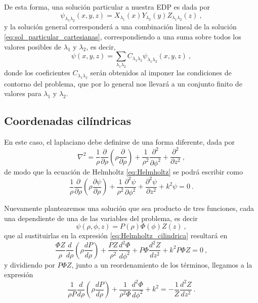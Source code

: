 De esta forma, una solución particular a nuestra EDP es dada por
\begin{equation} \label{eq:sol_particular_cartesianas}
    \psi_{\lambda_1 \lambda_2}(x,y,z) = X_{\lambda_1}(x) Y_{\lambda_2}(y) Z_{\lambda_1 \lambda_2}(z) \ ,
\end{equation}
y la solución general corresponderá a una combinación lineal de la solución \eqref{eq:sol_particular_cartesianas}, correspondiendo a una suma sobre todos los valores posibles de $\lambda_1$ y $\lambda_2$, es decir,
\begin{equation}
    \psi(x,y,z) = \sum_{\lambda_1 \lambda_2} C_{\lambda_1 \lambda_2} \psi_{\lambda_1 \lambda_2}(x,y,z) \ ,
\end{equation}
donde los coeficientes $C_{\lambda_1 \lambda_2}$ serán obtenidos al imponer las condiciones de contorno del problema, que por lo general nos llevará a un conjunto finito de valores para $\lambda_1$ y $\lambda_2$.

\newpage

\subsection{Coordenadas cilíndricas}

En este caso, el laplaciano debe definirse de una forma diferente, dada por
\begin{equation}
    \nabla^2 = \frac{1}{\rho} \frac{\partial}{\partial \rho} \left( \rho \frac{\partial}{\partial \rho} \right) + \frac{1}{\rho^2} \frac{\partial^2}{\partial \phi^2} + \frac{\partial^2}{\partial z^2} \ , 
\end{equation}
de modo que la ecuación de Helmholtz \eqref{eq:Helmholtz} se podrá escribir como
\begin{equation} \label{eq:Helmholtz_cilindrica}
    \frac{1}{\rho} \frac{\partial}{\partial \rho} \left( \rho \frac{\partial \psi}{\partial \rho} \right) + \frac{1}{\rho^2} \frac{\partial^2 \psi}{\partial \phi^2} + \frac{\partial^2 \psi}{\partial z^2} + k^2 \psi = 0 \ .
\end{equation}

Nuevamente plantearemos una solución que sea producto de tres funciones, cada una dependiente de una de las variables del problema, es decir
\begin{equation}
    \psi(\rho, \phi, z) = P(\rho) \Phi(\phi) Z(z) \ ,
\end{equation}
que al sustituirlas en la expresión \eqref{eq:Helmholtz_cilindrica} resultará en
\begin{equation}
    \frac{\Phi Z}{\rho} \frac{d}{d\rho}\left( \rho \frac{dP}{d\rho} \right) + \frac{PZ}{\rho^2} \frac{d^2 \Phi}{d\phi^2} + P\Phi \frac{d^2Z}{dz^2} + k^2 P\Phi Z = 0 \ ,
\end{equation}
y dividiendo por $P\Phi Z$, junto a un reordenamiento de los términos, llegamos a la expresión
\begin{equation}
    \frac{1}{\rho P} \frac{d}{d\rho} \left( \rho \frac{dP}{d\rho} \right) + \frac{1}{\rho^2 \Phi} \frac{d^2\Phi}{d\phi^2} + k^2 = - \frac{1}{Z} \frac{d^2Z}{dz^2} \ .
\end{equation}

